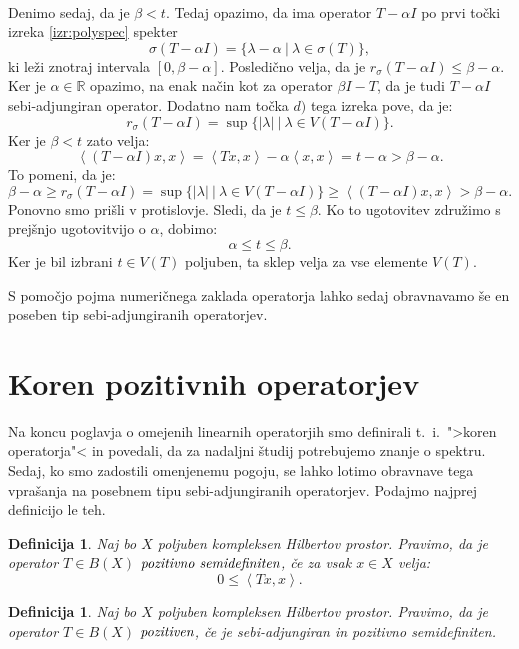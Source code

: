 \documentclass[12pt,a4paper,oneside,fleqn,openany]{book}
\newtheorem{definicija}[izrek]{Definicija}
\newcommand{\eopf}{\raisebox{0.8ex}{\framebox{}}} %
\newenvironment{dokaz}%
{\noindent{\bf Dokaz.}\ }%
{\hfill\eopf\par\bigskip}%
\newcommand{\R}{\mathbb{R}}
\newcommand{\abs}[1]{\ensuremath{\lvert #1 \rvert}}
\newcommand{\pojem}[1]{\ensuremath{\emph{#1}}}
\newcommand{\Sp}[2]{\ensuremath{\left<#1, #2\right>}}
\begin{document}
\begin{dokaz}
\begin{enumerate}[a)]
		Denimo sedaj, da je $\beta < t$. Tedaj opazimo, da ima operator $T - \alpha I$ po prvi točki izreka \ref{izr:polyspec} spekter $$\sigma(T - \alpha I)=\{\lambda - \alpha~|~ \lambda \in \sigma(T)\},$$ ki leži znotraj intervala $[0, \beta - \alpha]$. Posledično velja, da je $r_\sigma(T - \alpha I)\leq \beta - \alpha$. Ker je $\alpha\in\R$ opazimo, na enak način kot za operator $\beta I - T$, da je tudi $T - \alpha I$ sebi-adjungiran operator. Dodatno nam točka $d)$ tega izreka pove, da je: $$r_\sigma(T - \alpha I) = \sup\{\abs{\lambda}~|~\lambda\in V(T - \alpha I)\}.$$ Ker je $\beta < t$ zato velja: $$\Sp{(T - \alpha I)x}{x} = \Sp{Tx}{x} - \alpha\Sp{x}{x} = t - \alpha > \beta - \alpha.$$
		To pomeni, da je: $$\beta - \alpha \geq r_\sigma(T - \alpha I) =\sup\{\abs{\lambda}~|~\lambda\in V(T - \alpha I)\}\geq \Sp{(T - \alpha I)x}{x} > \beta - \alpha.$$
		Ponovno smo prišli v protislovje. Sledi, da je $t \leq \beta$. Ko to ugotovitev združimo s prejšnjo ugotovitvijo o $\alpha$, dobimo: $$\alpha \leq t \leq \beta.$$ Ker je bil izbrani $t\in V(T)$ poljuben, ta sklep velja za vse elemente $V(T)$.
	\end{enumerate}
\end{dokaz}

S pomočjo pojma numeričnega zaklada operatorja lahko sedaj obravnavamo še en poseben tip sebi-adjungiranih operatorjev.

\section{Koren pozitivnih operatorjev}

Na koncu poglavja o omejenih linearnih operatorjih smo definirali t.~i.~">koren operatorja"< in povedali, da za nadaljni študij potrebujemo znanje o spektru. Sedaj, ko smo zadostili omenjenemu pogoju, se lahko lotimo obravnave tega vprašanja na posebnem tipu sebi-adjungiranih operatorjev. Podajmo najprej definicijo le teh.

\begin{definicija}
	\label{def:pozsemiop}
	Naj bo $X$ poljuben kompleksen Hilbertov prostor. Pravimo, da je operator $T\in B(X)$ \pojem{pozitivno semidefiniten}, če za vsak $x\in X$ velja: $$0 \leq \Sp{Tx}{x}.$$
\end{definicija}

\begin{definicija}
	\label{def:pozop}
	Naj bo $X$ poljuben kompleksen Hilbertov prostor. Pravimo, da je operator $T\in B(X)$ \pojem{pozitiven}, če je sebi-adjungiran in pozitivno semidefiniten.
\end{definicija}
\end{document}
